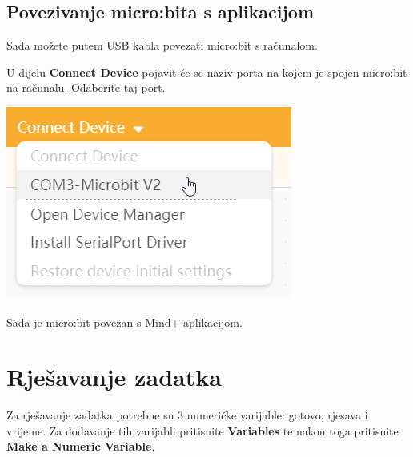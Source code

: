\subsection{Povezivanje micro:bita s aplikacijom}

Sada možete putem USB kabla povezati micro:bit s računalom.

U dijelu \textbf{Connect Device} pojavit će se naziv porta na kojem je spojen micro:bit na računalu. Odaberite taj port.

\vspace{3mm}

\includegraphics[scale=0.75]{Mindplus12.png}

\vspace{3mm}

Sada je micro:bit povezan s Mind+ aplikacijom.



\section{Rješavanje zadatka}

Za rješavanje zadatka potrebne su 3 numeričke varijable: gotovo, rjesava i vrijeme. Za dodavanje tih varijabli pritisnite \textbf{Variables} te nakon toga pritisnite \textbf{Make a Numeric Variable}.

\vspace{3mm}

